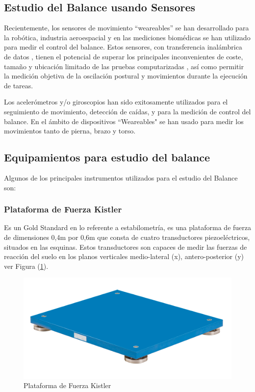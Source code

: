 \documentclass[12pt,a4paper]{article}
\begin{document}
\subsection{Estudio del Balance usando Sensores}
Recientemente, los sensores de movimiento ``weareables'' se han desarrollado para la robótica, industria aeroespacial y en las mediciones biomédicas se han utilizado para medir el control del balance\cite{mancini_relevance_2010}. Estos sensores, con transferencia inalámbrica de datos , tienen el potencial de superar los principales inconvenientes de coste, tamaño y ubicación limitado de las pruebas computarizadas , así como permitir la medición objetiva de la oscilación postural y movimientos durante la ejecución de tareas.

Los acelerómetros y/o giroscopios han sido exitosamente utilizados \cite{mancini_relevance_2010} para el seguimiento de movimiento,  detección de caídas, y para la medición de control del balance. En el ámbito de dispositivos ``Weareables" se han usado para medir los movimientos tanto de pierna, brazo y torso.


\subsection{Equipamientos para estudio del balance} Algunos de los principales instrumentos utilizados para el estudio del Balance son:


\subsubsection{Plataforma de Fuerza Kistler} Es un Gold Standard  en lo referente a estabilometría\cite{donath_testing_2012}, es una plataforma de fuerza de dimensiones
	0,4m por 0,6m que consta de cuatro 	transductores piezoeléctricos, situados en las esquinas. Estos transductores son capaces de medir las fuerzas de reacción del suelo en los planos verticales medio-lateral (x), antero-posterior (y) ver Figura (\ref{fig:KistlerFP}).

\begin{figure}[H]
	\centering
	\includegraphics[width=0.5\linewidth]{images/KistlerFP}
	\caption{Plataforma de Fuerza Kistler}
	\label{fig:KistlerFP}
\end{figure}
\end{document}
